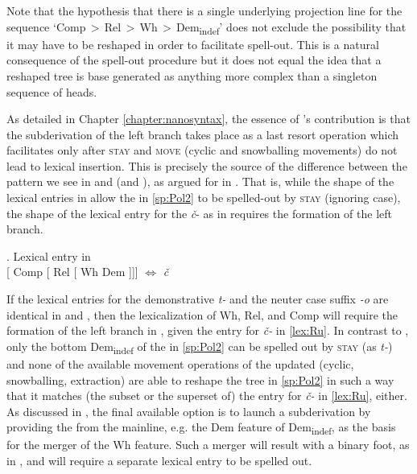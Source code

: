 \noindent Note that the hypothesis that there is a single underlying projection line for the sequence `Comp\,$>$\,Rel\,$>$\,Wh\,$>$\,Dem\textsubscript{indef}' does not exclude the possibility that it may have to be reshaped in order to facilitate spell-out. This is a natural consequence of the spell-out procedure but it does not equal the idea that a reshaped tree is base generated as anything more complex than a singleton sequence of heads.
\par
 As detailed in Chapter \ref{chapter:nanosyntax}, the essence of \citeauthor{Starke2018}'s   \citeyearpar{Starke2018} contribution is that the subderivation of the left branch takes place as a last resort operation which facilitates  only after \textsc{stay} and \textsc{move} (cyclic and snowballing movements) do not lead to lexical insertion. This is precisely the source of the difference between the pattern we see in  and  (and ), as argued for in \citet{Wiland-PSiCL}. That is, while the shape of the lexical entries in  allow the  in \ref{sp:Pol2} to be spelled-out by \textsc{stay} (ignoring case), the shape of the lexical entry for the  \textit{\v{c}}- as in \Next requires the formation of the left branch. 

\ex.\label{lex:Ru} Lexical entry in \\[0.25ex]
 [ Comp [ Rel [ Wh Dem ]]] $\Leftrightarrow$ \textit{\v{c}}

If the lexical entries for the demonstrative \textit{t-} and the neuter case suffix \textit{-o} are identical in  and , then the  lexicalization of Wh, Rel, and Comp will require the formation of the left branch in , given the entry for \textit{\v{c}-} in \ref{lex:Ru}. In contrast to , only the bottom Dem\textsubscript{indef} of the  in \ref{sp:Pol2} can be spelled out by \textsc{stay} (as \textit{t-}) and none of the available movement operations of the updated  (cyclic, snowballing, extraction) are able to reshape the tree in \ref{sp:Pol2} in such a way that it matches (the subset or the superset of) the entry for \textit{\v{c}-} in \ref{lex:Ru}, either. As discussed in , the final available option is to launch a subderivation by providing the  from the mainline, e.g. the Dem feature of Dem\textsubscript{indef}, as the basis for the merger of the Wh feature. Such a merger will result with a binary foot, as in \Next, and will require a separate lexical entry to be spelled out.

